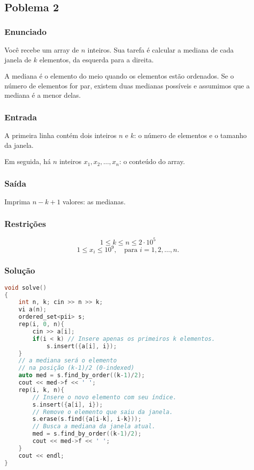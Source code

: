 \subsection{Poblema 2}

\subsubsection*{Enunciado}
Você recebe um array de \( n \) inteiros. Sua tarefa é calcular a mediana de cada janela de \( k \) elementos, da esquerda para a direita.

A mediana é o elemento do meio quando os elementos estão ordenados. Se o número de elementos for par, existem duas medianas possíveis e assumimos que a mediana é a menor delas.

\subsubsection*{Entrada}
A primeira linha contém dois inteiros \( n \) e \( k \): o número de elementos e o tamanho da janela.

Em seguida, há \( n \) inteiros \( x_1, x_2, \dots, x_n \): o conteúdo do array.

\subsubsection*{Saída}
Imprima \( n-k+1 \) valores: as medianas.

\subsubsection*{Restrições}
\[
1 \le k \le n \le 2 \cdot 10^5
\]
\[
1 \le x_i \le 10^9, \quad \text{para } i = 1, 2, \dots, n.
\]


\subsubsection*{Solução}
\begin{lstlisting}[language=C++]
void solve()
{
    int n, k; cin >> n >> k;
    vi a(n);
    ordered_set<pii> s;
    rep(i, 0, n){
        cin >> a[i];
        if(i < k) // Insere apenas os primeiros k elementos.
            s.insert({a[i], i});
    }
    // a mediana será o elemento 
    // na posição (k-1)/2 (0-indexed)
    auto med = s.find_by_order((k-1)/2);
    cout << med->f << ' ';
    rep(i, k, n){
        // Insere o novo elemento com seu índice.
        s.insert({a[i], i});
        // Remove o elemento que saiu da janela.
        s.erase(s.find({a[i-k], i-k}));
        // Busca a mediana da janela atual.
        med = s.find_by_order((k-1)/2);
        cout << med->f << ' ';
    }
    cout << endl;
}
    
\end{lstlisting}

